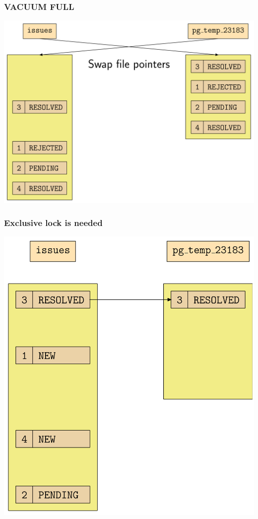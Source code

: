 \begin{frame}
  \frametitle{VACUUM FULL}
  \includegraphics[height=\sizeforimages\textheight]{images/vacuum_full_02.png}
\end{frame}

\begin{frame}
  \frametitle{Exclusive lock is needed}
  \begin{center}
    \includegraphics[height=\sizeforimages\textheight]{images/exclusive_lock_needed_01.png}
  \end{center}
\end{frame}

